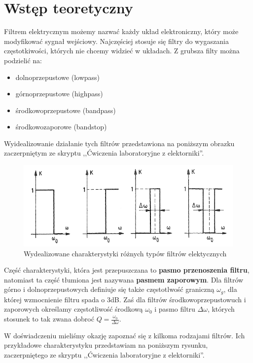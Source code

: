 \documentclass[a4paper,11pt]{article}
\begin{document}
\section{Wstęp teoretyczny}

Filtrem elektrycznym możemy nazwać każdy układ elektroniczny, który może modyfikować sygnał wejściowy. Najczęściej stosuje się filtry do wygaszania częstotkiwości, których nie chcemy widzieć w układach. Z grubsza filty można podzielić na: 
\begin{itemize}
  \item dolnoprzepustowe (lowpass) 
  \item górnoprzepustowe (highpass)
  \item środkowoprzepustowe (bandpass)
  \item środkowozaporowe (bandstop)
\end{itemize}
Wyidealizowanie działanie tych filtrów przedstawiona na poniższym obrazku zaczerpniętym ze skryptu ,,Ćwiczenia laboratoryjne z elektorniki''.  


\begin{figure} [H]
  \begin{center}
    \includegraphics[width=14cm]{filtry.png}
    \caption{ Wydealizowane charakterystyki różnych typów filtrów elektycznych}
  \end{center}
\end{figure}

Część charakterystyki, która jest przepuszczana to \textbf{pasmo przenoszenia filtru}, natomiast ta część tłumiona jest nazywana \textbf{pasmem zaporowym}. Dla filtrów górno i dolnoprzepustowych definiuje się także częstotlwość graniczną $ \omega_g$, dla której wzmocnienie filtru spada o 3dB. Zaś dla filtrów środkowoprzepustowuch i zaporowych określamy częstotliwość środkową $ \omega_0$ i pasmo filtru $\Delta \omega$, których stosunek to tak zwana dobroć $ Q=\frac {\omega_0}{\Delta \omega}$. 

W doświadczeniu mieliśmy okazję zapoznać się z kilkoma rodzajami filtrów. Ich przykładowe charakterystyku przedstawiam na poniższym rysunku, zaczerpniętego ze skryptu ,,Ćwiczenia laboratoryjne z elektorniki''. 
\end{document}
